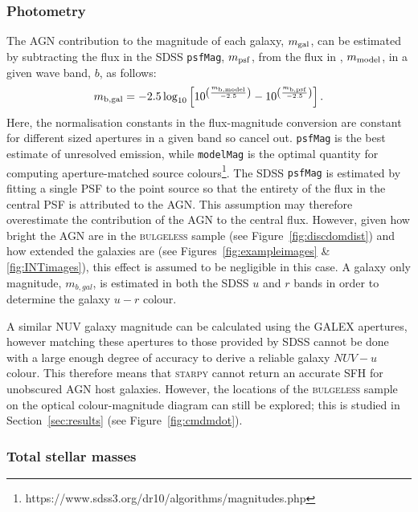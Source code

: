 {\subsubsection{Photometry}\label{sec:photo}

The AGN contribution to the magnitude of each galaxy, $m_{\rm{gal}}$, can be estimated by subtracting the flux in the SDSS {\tt psfMag}, $m_{\rm{psf}}$, from the flux in {}, $m_{\rm{model}}$, in a given wave band, $b$, as follows:
\begin{equation}\label{galmag}
m_{\rm{b, gal}} = -2.5 \log_{10} \left[ 10^{\left(\frac{m_{\rm{b, model}}}{-2.5}\right)} - 10^{\left(\frac{m_{\rm{b, psf}}}{-2.5}\right)} \right].
\end{equation}
Here, the normalisation constants in the flux-magnitude conversion are constant for different sized apertures in a given band so cancel out. {\tt psfMag} is the best estimate of unresolved emission, while {\tt modelMag} is the optimal quantity for computing aperture-matched source colours\footnote{https://www.sdss3.org/dr10/algorithms/magnitudes.php}. The SDSS {\tt psfMag} is estimated by fitting a single PSF to the point source so that the entirety of the flux in the central PSF is attributed to the AGN. This assumption may therefore overestimate the contribution of the AGN to the central flux. However, given how bright the AGN are in the \textsc{bulgeless} sample (see Figure~\ref{fig:discdomdist}) and how extended the galaxies are (see Figures~\ref{fig:exampleimages} \& \ref{fig:INTimages}), this effect is assumed to be negligible in this case. A galaxy only magnitude, $m_{b, gal}$, is estimated in both the SDSS $u$ and $r$ bands in order to determine the galaxy $u-r$ colour. 

A similar NUV galaxy magnitude can be calculated using the GALEX apertures, however matching these apertures to those provided by SDSS cannot be done with a large enough degree of accuracy to derive a reliable galaxy $NUV-u$ colour. This therefore means that \textsc{starpy} cannot return an accurate SFH for unobscured AGN host galaxies. However, the locations of the \textsc{bulgeless} sample on the optical colour-magnitude diagram can still be explored; this is studied in Section~\ref{sec:results} (see Figure~\ref{fig:cmdmdot}). 

\subsubsection{Total stellar masses}\label{sec:galmass}

}
